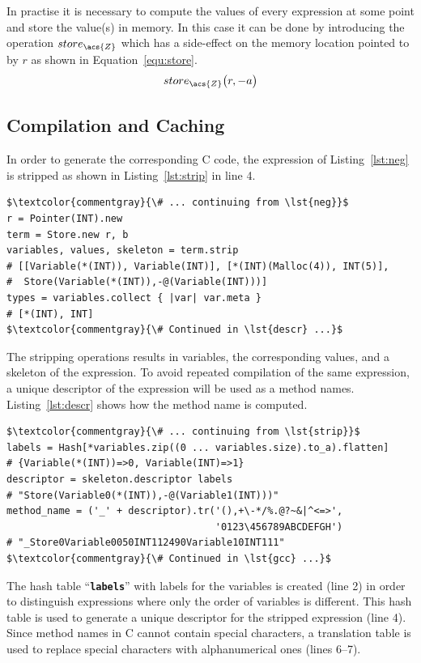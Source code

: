 \documentclass[12pt,a4paper,oneside,openright]{book}
\newcommand{\equ}[1]{Equation~\ref{equ:#1}}
\newcommand{\lst}[1]{Listing~\ref{lst:#1}}
\newcommand{\code}[1]{``\texttt{\textbf{\textcolor{codegray}{\small{#1}}}}''}
\begin{document}
\begin{CJK}{UTF8}{}
In practise it is necessary to compute the values of every expression at some point and store the value(s) in memory. In this case it can be done by introducing the operation $store_{\acs{Z}}$ which has a side-effect on the memory location pointed to by $r$ as shown in \equ{store}.
\begin{equation}\label{equ:store}
  store_{\acs{Z}}\big(r,-a\big)
\end{equation}

\subsection{Compilation and Caching}\label{cha:caching}
In order to generate the corresponding C code, the expression of \lst{neg} is stripped as shown in \lst{strip} in line 4.
\lstset{language=Ruby,frame=single,numbers=left}
\begin{lstlisting}[float,caption={Stripping values from an expression},escapechar=\$,label=lst:strip,name=gcc]
$\textcolor{commentgray}{\# ... continuing from \lst{neg}}$
r = Pointer(INT).new
term = Store.new r, b
variables, values, skeleton = term.strip
# [[Variable(*(INT)), Variable(INT)], [*(INT)(Malloc(4)), INT(5)],
#  Store(Variable(*(INT)),-@(Variable(INT)))]
types = variables.collect { |var| var.meta }
# [*(INT), INT]
$\textcolor{commentgray}{\# Continued in \lst{descr} ...}$
\end{lstlisting}
The stripping operations results in variables, the corresponding values, and a skeleton of the expression. To avoid repeated compilation of the same expression, a unique descriptor of the expression will be used as a method names. \lst{descr} shows how the method name is computed.
\lstset{language=Ruby,frame=single,numbers=left}
\begin{lstlisting}[float,caption={Generating a unique descriptor},escapechar=\$,label=lst:descr,name=gcc]
$\textcolor{commentgray}{\# ... continuing from \lst{strip}}$
labels = Hash[*variables.zip((0 ... variables.size).to_a).flatten]
# {Variable(*(INT))=>0, Variable(INT)=>1}
descriptor = skeleton.descriptor labels
# "Store(Variable0(*(INT)),-@(Variable1(INT)))"
method_name = ('_' + descriptor).tr('(),+\-*/%.@?~&|^<=>',
                                    '0123\456789ABCDEFGH')
# "_Store0Variable0050INT112490Variable10INT111"
$\textcolor{commentgray}{\# Continued in \lst{gcc} ...}$
\end{lstlisting}
The hash table \code{labels} with labels for the variables is created (line 2) in order to distinguish expressions where only the order of variables is different. This hash table is used to generate a unique descriptor for the stripped expression (line 4). Since method names in C cannot contain special characters, a translation table is used to replace special characters with alphanumerical ones (lines 6--7).


\end{CJK}
\end{document}

